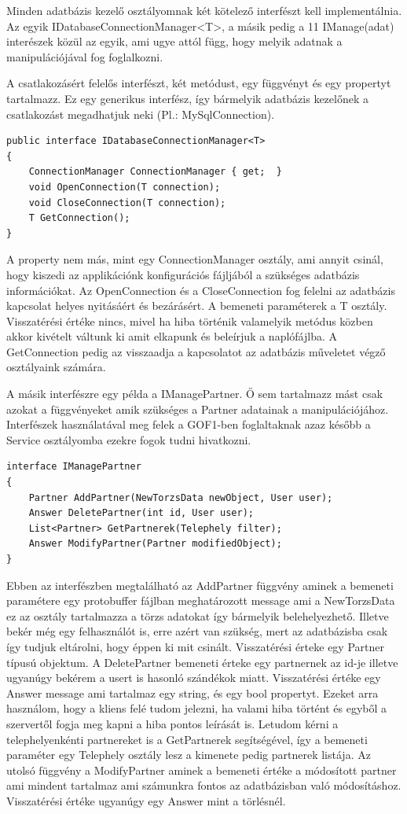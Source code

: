 \documentclass[
]{thesis-ekf}
\theoremstyle{definition}
\theoremstyle{remark}
\begin{document}
Minden adatbázis kezelő osztályomnak két kötelező interfészt kell implementálnia. Az egyik IDatabaseConnectionManager<T>, a másik pedig a 11 IManage(adat) interészek közül az egyik, ami ugye attól függ, hogy melyik adatnak a manipulációjával fog foglalkozni.

A csatlakozásért felelős interfészt, két metódust, egy függvényt és egy propertyt tartalmazz.
Ez egy generikus interfész, így bármelyik adatbázis kezelőnek a csatlakozást megadhatjuk neki (Pl.: MySqlConnection).
\begin{lstlisting}
public interface IDatabaseConnectionManager<T>
{     
	ConnectionManager ConnectionManager { get;  }
	void OpenConnection(T connection);
	void CloseConnection(T connection);
	T GetConnection();
}
\end{lstlisting}
A property nem más, mint egy ConnectionManager osztály, ami annyit csinál, hogy kiszedi az applikációnk konfigurációs fájljából a szükséges adatbázis információkat. Az OpenConnection és a CloseConnection fog felelni az adatbázis kapcsolat helyes nyitásáért és bezárásért. A bemeneti paraméterek a T osztály. Visszatérési értéke nincs, mivel ha hiba történik valamelyik metódus közben akkor kivételt váltunk ki amit elkapunk és beleírjuk a naplófájlba. A GetConnection pedig az visszaadja a kapcsolatot az adatbázis műveletet végző osztályaink számára.

A másik interfészre egy példa a IManagePartner. Ő sem tartalmazz mást csak azokat a függvényeket amik szükséges a Partner adatainak a manipulációjához. Interfészek használatával meg felek a GOF1-ben foglaltaknak azaz később a Service osztályomba ezekre fogok tudni hivatkozni.
\begin{lstlisting}
interface IManagePartner
{
	Partner AddPartner(NewTorzsData newObject, User user);
	Answer DeletePartner(int id, User user);
	List<Partner> GetPartnerek(Telephely filter);
	Answer ModifyPartner(Partner modifiedObject);
}
\end{lstlisting}
Ebben az interfészben megtalálható az AddPartner függvény aminek a bemeneti paramétere egy protobuffer fájlban meghatározott message ami a NewTorzsData ez az osztály tartalmazza a törzs adatokat így bármelyik belehelyezhető. Illetve bekér még egy felhasználót is, erre azért van szükség, mert az adatbázisba csak így tudjuk eltárolni, hogy éppen ki mit csinált. Visszatérési érteke egy Partner típusú objektum. A DeletePartner bemeneti érteke egy partnernek az id-je illetve ugyanúgy bekérem a usert is hasonló szándékok miatt. Visszatérési értéke egy Answer message ami tartalmaz egy string, és egy bool propertyt. Ezeket arra használom, hogy a kliens felé tudom jelezni, ha valami hiba történt és egyből a szervertől fogja meg kapni a hiba pontos leírását is. Letudom kérni a telephelyenkénti partnereket is a GetPartnerek segítségével, így a bemeneti paraméter egy Telephely osztály lesz a kimenete pedig partnerek listája. Az utolsó függvény a ModifyPartner aminek a bemeneti értéke a módosított partner ami mindent tartalmaz ami számunkra fontos az adatbázisban való módosításhoz. Visszatérési értéke ugyanúgy egy Answer mint a törlésnél.
\end{document}
